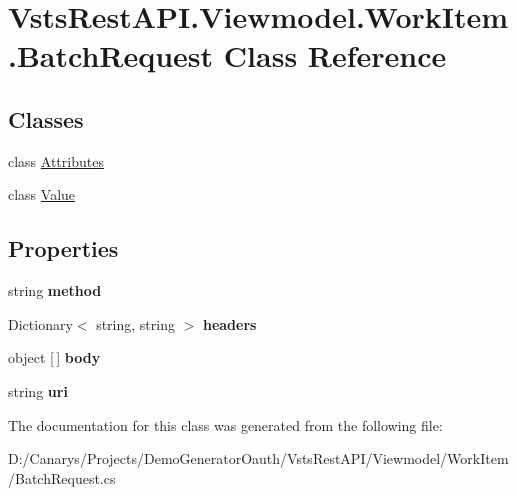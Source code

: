 \hypertarget{class_vsts_rest_a_p_i_1_1_viewmodel_1_1_work_item_1_1_batch_request}{}\section{Vsts\+Rest\+A\+P\+I.\+Viewmodel.\+Work\+Item.\+Batch\+Request Class Reference}
\label{class_vsts_rest_a_p_i_1_1_viewmodel_1_1_work_item_1_1_batch_request}
\subsection*{Classes}
\begin{DoxyCompactItemize}
\item 
class \mbox{\hyperlink{class_vsts_rest_a_p_i_1_1_viewmodel_1_1_work_item_1_1_batch_request_1_1_attributes}{Attributes}}
\item 
class \mbox{\hyperlink{class_vsts_rest_a_p_i_1_1_viewmodel_1_1_work_item_1_1_batch_request_1_1_value}{Value}}
\end{DoxyCompactItemize}
\subsection*{Properties}
\begin{DoxyCompactItemize}
\item 
\mbox{\label{class_vsts_rest_a_p_i_1_1_viewmodel_1_1_work_item_1_1_batch_request_a941c29142e8a78650b7ab3a4d544b9da}} 
string {\bfseries method}
\item 
\mbox{\label{class_vsts_rest_a_p_i_1_1_viewmodel_1_1_work_item_1_1_batch_request_aa4def25e1e525eb3792bfeb84eeb732c}} 
Dictionary$<$ string, string $>$ {\bfseries headers}
\item 
\mbox{\label{class_vsts_rest_a_p_i_1_1_viewmodel_1_1_work_item_1_1_batch_request_a5abde03bf474916d95c1c240615f38a2}} 
object \mbox{[}$\,$\mbox{]} {\bfseries body}
\item 
\mbox{\label{class_vsts_rest_a_p_i_1_1_viewmodel_1_1_work_item_1_1_batch_request_add855464778b210044708bc4623a0a4a}} 
string {\bfseries uri}
\end{DoxyCompactItemize}


The documentation for this class was generated from the following file\+:\begin{DoxyCompactItemize}
\item 
D\+:/\+Canarys/\+Projects/\+Demo\+Generator\+Oauth/\+Vsts\+Rest\+A\+P\+I/\+Viewmodel/\+Work\+Item/Batch\+Request.\+cs\end{DoxyCompactItemize}
